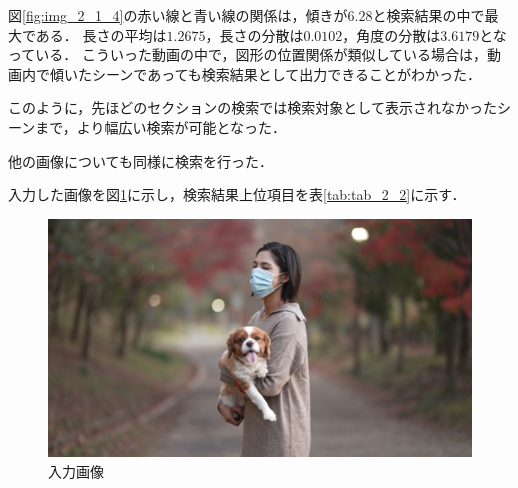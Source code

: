 \documentclass[a4j,12pt,dvipdfmx]{jreport}
\begin{document}
図\ref{fig:img_2_1_4}の赤い線と青い線の関係は，傾きが$6.28$と検索結果の中で最大である．
長さの平均は$1.2675$，長さの分散は$0.0102$，角度の分散は$3.6179$となっている．
こういった動画の中で，図形の位置関係が類似している場合は，動画内で傾いたシーンであっても検索結果として出力できることがわかった．

このように，先ほどのセクションの検索では検索対象として表示されなかったシーンまで，より幅広い検索が可能となった．

他の画像についても同様に検索を行った．

入力した画像を図\ref{fig:img_2_2_1}に示し，検索結果上位項目を表\ref{tab:tab_2_2}に示す．

\begin{figure}[H]
  \centering
  \includegraphics[width=13cm]{image/result2_2_2.jpg}
  \caption{入力画像}
  \label{fig:img_2_2_1}
\end{figure}
\end{document}

